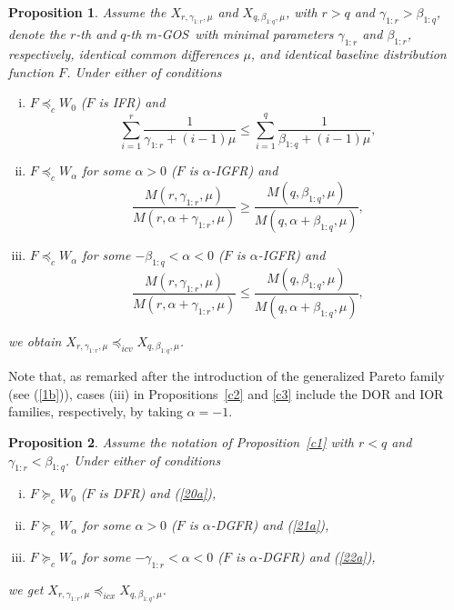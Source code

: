 \documentclass [11pt]{article}
\newtheorem{proposition}{Proposition}
\newcommand{\gos}{GOS}
\begin{document}
\begin{proposition}\label{c2a}
Assume the $X_{r,\gamma_{1:r}, \mu}$ and  $X_{q,\beta_{1:q},\mu}$, with $r > q$ and $\gamma_{1:r} > \beta_{1:q}$,
denote the $r$-th and $q$-th $m$-\gos\ with minimal parameters  $\gamma_{1:r}$ and $\beta_{1:r}$, respectively, identical common differences $\mu$, and identical baseline distribution function $F$.
Under either of conditions
    \begin{enumerate}[(i)]
    \item
    $F\preceq_c W_0$ ($F$ is IFR) and
    \begin{equation}
    \label{20a}
    \sum_{i=1}^r \frac{1}{\gamma_{1:r}+ (i-1)\mu} \leq
    \sum_{i=1}^q \frac{1}{\beta_{1:q}+ (i-1)\mu},
    \end{equation}

    \item
    $F\preceq_c W_\alpha$ for some $\alpha >0$ ($F$ is $\alpha$-IGFR) and
    \begin{equation}
    \label{21a}
    \frac{M(r,\gamma_{1:r},\mu)}{M(r,\alpha+\gamma_{1:r},\mu)} \geq \frac{M(q,\beta_{1:q},\mu)}{M(q,\alpha+\beta_{1:q},\mu)},
    \end{equation}

    \item
    $F\preceq_c W_\alpha$ for some $-\beta_{1:q} < \alpha <0$
    ($F$ is $\alpha$-IGFR) and
    \begin{equation}
    \label{22a}
    \frac{M(r,\gamma_{1:r},\mu)}{M(r,\alpha+\gamma_{1:r},\mu)} \leq \frac{M(q,\beta_{1:q},\mu)}{M(q,\alpha+\beta_{1:q},\mu)},
    \end{equation}
    \end{enumerate}
we obtain $X_{r,\gamma_{1:r},\mu} \preceq_{icv}X_{q,\beta_{1:q},\mu}$.
\end{proposition}

Note that, as remarked after the introduction of the generalized Pareto family (see (\ref{1b})), cases (iii) in Propositions~\ref{c2} and \ref{c3} include the DOR and IOR families, respectively, by taking $\alpha=-1$.

\begin{proposition}\label{c3a}
Assume the notation of Proposition~\ref{c1} with  $r<q$ and $\gamma_{1:r} < \beta_{1:q}$. Under either of conditions
    \begin{enumerate}[(i)]
    \item
    $F\succeq_c W_0$ ($F$ is DFR) and (\ref{20a}),

    \item
    $F\succeq_c W_\alpha$ for some $\alpha >0$ ($F$ is $\alpha$-DGFR) and (\ref{21a}),

    \item
    $F\succeq_c W_\alpha$ for some $-\gamma_{1:r} < \alpha <0$  ($F$ is $\alpha$-DGFR) and (\ref{22a}),
    \end{enumerate}
we get $X_{r,\gamma_{1:r},\mu} \preceq_{icx}X_{q,\beta_{1:q},\mu}$. 
\end{proposition}
\end{document}
